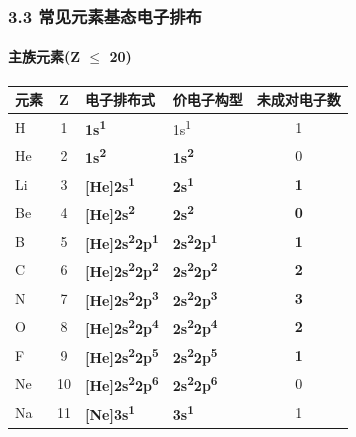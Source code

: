 \subsubsection{3.3 常见元素基态电子排布}\label{ux5e38ux89c1ux5143ux7d20ux57faux6001ux7535ux5b50ux6392ux5e03}

\paragraph{\texorpdfstring{主族元素(Z \(\leq\) 20)}{主族元素(Z \textbackslash leq 20)}}\label{ux4e3bux65cfux5143ux7d20z-leq-20}

{\def\LTcaptype{none} %
\begin{longtable}[]{@{}lcllc@{}}
\toprule\noalign{}
元素 & Z & 电子排布式 & 价电子构型 & 未成对电子数 \\
\midrule\noalign{}
\endhead
\bottomrule\noalign{}
\endlastfoot
H & 1 & \textbf{1s\textsuperscript{1}} & 1s\textsuperscript{1} & 1 \\
He & 2 & \textbf{1s\textsuperscript{2}} & \textbf{1s\textsuperscript{2}} & 0 \\
Li & 3 & \textbf{{[}He{]}2s\textsuperscript{1}} & \textbf{2s\textsuperscript{1}} & \textbf{1} \\
Be & 4 & \textbf{{[}He{]}2s\textsuperscript{2}} & \textbf{2s\textsuperscript{2}} & \textbf{0} \\
B & 5 & \textbf{{[}He{]}2s\textsuperscript{2}2p\textsuperscript{1}} & \textbf{2s\textsuperscript{2}2p\textsuperscript{1}} & \textbf{1} \\
C & 6 & \textbf{{[}He{]}2s\textsuperscript{2}2p\textsuperscript{2}} & \textbf{2s\textsuperscript{2}2p\textsuperscript{2}} & \textbf{2} \\
N & 7 & \textbf{{[}He{]}2s\textsuperscript{2}2p\textsuperscript{3}} & \textbf{2s\textsuperscript{2}2p\textsuperscript{3}} & \textbf{3} \\
O & 8 & \textbf{{[}He{]}2s\textsuperscript{2}2p\textsuperscript{4}} & \textbf{2s\textsuperscript{2}2p\textsuperscript{4}} & \textbf{2} \\
F & 9 & \textbf{{[}He{]}2s\textsuperscript{2}2p\textsuperscript{5}} & \textbf{2s\textsuperscript{2}2p\textsuperscript{5}} & \textbf{1} \\
Ne & 10 & \textbf{{[}He{]}2s\textsuperscript{2}2p\textsuperscript{6}} & \textbf{2s\textsuperscript{2}2p\textsuperscript{6}} & 0 \\
Na & 11 & \textbf{{[}Ne{]}3s\textsuperscript{1}} & \textbf{3s\textsuperscript{1}} & 1 \\

\end{longtable}}
